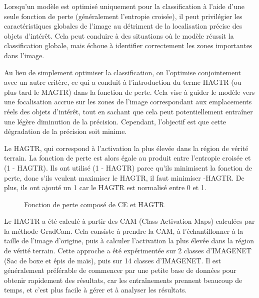 \documentclass{report}
\begin{document}
{\hspace{1.6cm}Lorsqu'un modèle est optimisé uniquement pour la classification à l'aide d'une seule fonction de perte (généralement l'entropie croisée), il peut privilégier les caractéristiques globales de l'image au détriment de la localisation précise des objets d'intérêt. Cela peut conduire à des situations où le modèle réussit la classification globale, mais échoue à identifier correctement les zones importantes dans l'image.

\hspace{1.6cm}Au lieu de simplement optimiser la classification, on l'optimise conjointement avec un autre critère, ce qui a conduit à l'introduction du terme HAGTR (ou plus tard le MAGTR) dans la fonction de perte. Cela vise à guider le modèle vers une focalisation accrue sur les zones de l'image correspondant aux emplacements réels des objets d'intérêt, tout en sachant que cela peut potentiellement entraîner une légère diminution de la précision. Cependant, l'objectif est que cette dégradation de la précision soit minime.

\hspace{1.6cm}Le HAGTR, qui correspond à l'activation la plus élevée dans la région de vérité terrain\cite{Wyctor22}. La fonction de perte est alors égale au produit entre l'entropie croisée et (1 - HAGTR). Ils ont utilisé (1 - HAGTR) parce qu'ils minimisent la fonction de perte, donc s'ils veulent maximiser le HAGTR, il faut minimiser -HAGTR. De plus, ils ont ajouté un 1 car le HAGTR est normalisé entre 0 et 1.

\begin{figure}[htbp] 
	\centering
	\caption{Fonction de perte composé de CE et HAGTR}
	\label{fig:Fonction de perte composée de CE et HAGTR}
\end{figure}

\hspace{1.6cm}Le HAGTR a été calculé à partir des CAM (Class Activation Maps) calculées par la méthode GradCam. Cela consiste à prendre la CAM, à l'échantillonner à la taille de l'image d'origine, puis à calculer l'activation la plus élevée dans la région de vérité terrain. Cette approche a été expérimentée sur 2 classes d'IMAGENET (Sac de boxe et épis de maïs), puis sur 14 classes d'IMAGENET. Il est généralement préférable de commencer par une petite base de données pour obtenir rapidement des résultats, car les entraînements prennent beaucoup de temps, et c'est plus facile à gérer et à analyser les résultats.

}
\end{document}
